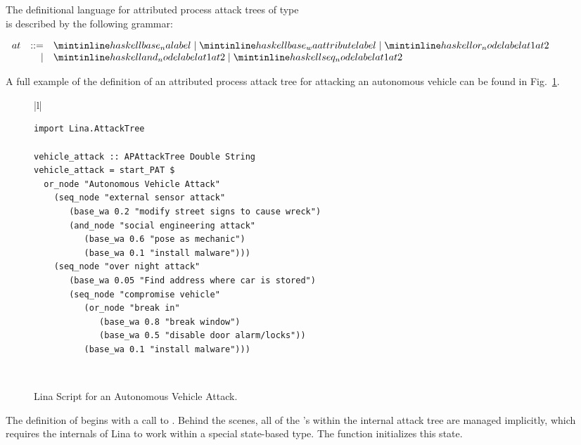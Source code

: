 The definitional language for attributed process attack trees of type \\
 is described by the following
grammar:
\begin{center}
  \footnotesize
  \begin{math}
    \begin{array}{lrlll}
      at & ::=  & \mh{base_na label} \mid \mh{base_wa attribute label} \mid \mh{or_node label at1 at2} \\
      & \mid & \mh{and_node label at1 at2} \mid \mh{seq_node label at1 at2}\\
    \end{array}
  \end{math}
\end{center}
A full example of the definition of an attributed process attack tree
for attacking an autonomous vehicle can be found in
Fig.~\ref{fig:vehicle_attack}. 
\begin{figure}
      \begin{tabular}{|l|}
        \hline\\[-7px]
      \begin{minipage}{\textwidth}
        \begin{verbatim}
import Lina.AttackTree

vehicle_attack :: APAttackTree Double String
vehicle_attack = start_PAT $
  or_node "Autonomous Vehicle Attack"
    (seq_node "external sensor attack"
       (base_wa 0.2 "modify street signs to cause wreck")
       (and_node "social engineering attack"
          (base_wa 0.6 "pose as mechanic")
          (base_wa 0.1 "install malware")))
    (seq_node "over night attack"
       (base_wa 0.05 "Find address where car is stored")
       (seq_node "compromise vehicle"
          (or_node "break in"
             (base_wa 0.8 "break window")
             (base_wa 0.5 "disable door alarm/locks"))
          (base_wa 0.1 "install malware")))
        \end{verbatim}
        \vspace{2px}
      \end{minipage} \\
      \hline
    \end{tabular}
  \caption{Lina Script for an Autonomous Vehicle Attack.}
  \label{fig:vehicle_attack}
\end{figure}
The definition of  begins with a call to
.  Behind the scenes, all of the 's within the
internal attack tree are managed implicitly, which requires the
internals of Lina to work within a special state-based type.  The
function  initializes this state.

